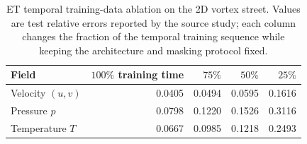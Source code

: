 \begin{table}[htbp]
  \centering
  \small
  \begin{tabular}{@{}lrrrr@{}}
    \toprule
    Field & $100\%$ training time & $75\%$ & $50\%$ & $25\%$ \\
    \midrule
    Velocity $(u,v)$ & 0.0405 & 0.0494 & 0.0595 & 0.1616 \\
    Pressure $p$ & 0.0798 & 0.1220 & 0.1526 & 0.3116 \\
    Temperature $T$ & 0.0667 & 0.0985 & 0.1218 & 0.2493 \\
    \bottomrule
  \end{tabular}
  \caption{ET temporal training-data ablation on the 2D vortex street. Values are test relative errors reported by the source study; each column changes the fraction of the temporal training sequence while keeping the architecture and masking protocol fixed.}
  \label{tab:app-et-temporal}
\end{table}
